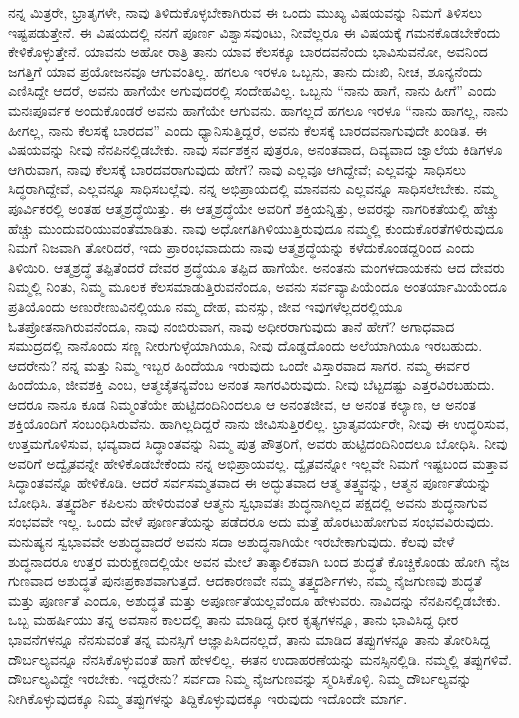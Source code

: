 ನನ್ನ ಮಿತ್ರರೇ, ಭ್ರಾತೃಗಳೇ, ನಾವು ತಿಳಿದುಕೊಳ್ಳಬೇಕಾಗಿರುವ ಈ ಒಂದು ಮುಖ್ಯ ವಿಷಯವನ್ನು ನಿಮಗೆ ತಿಳಿಸಲು ಇಷ್ಟಪಡುತ್ತೇನೆ. ಈ ವಿಷಯದಲ್ಲಿ ನನಗೆ ಪೂರ್ಣ ವಿಶ್ವಾಸವುಂಟು, ನೀವೆಲ್ಲರೂ ಈ ವಿಷಯಕ್ಕೆ ಗಮನಕೊಡಬೇಕೆಂದು ಕೇಳಿಕೊಳ್ಳುತ್ತೇನೆ. ಯಾವನು ಅಹೋ ರಾತ್ರಿ ತಾನು ಯಾವ ಕೆಲಸಕ್ಕೂ ಬಾರದವನೆಂದು ಭಾವಿಸುವನೋ, ಅವನಿಂದ ಜಗತ್ತಿಗೆ ಯಾವ ಪ್ರಯೋಜನವೂ ಆಗುವಂತಿಲ್ಲ. ಹಗಲೂ ಇರಳೂ ಒಬ್ಬನು, ತಾನು ದುಃಖಿ, ನೀಚ, ಶೂನ್ಯನೆಂದು ಎಣಿಸಿದ್ದೇ ಆದರೆ, ಅವನು ಹಾಗೆಯೇ ಅಗುವುದರಲ್ಲಿ ಸಂದೇಹವಿಲ್ಲ. ಒಬ್ಬನು “ನಾನು ಹಾಗೆ, ನಾನು ಹೀಗೆ” ಎಂದು ಮನಃಪೂರ್ವಕ ಅಂದುಕೊಂಡರೆ ಅವನು ಹಾಗೆಯೇ ಆಗುವನು. ಹಾಗಲ್ಲದೆ ಹಗಲೂ ಇರಳೂ “ನಾನು ಹಾಗಲ್ಲ, ನಾನು ಹೀಗಲ್ಲ, ನಾನು ಕೆಲಸಕ್ಕೆ ಬಾರದವ” ಎಂದು ಧ್ಯಾನಿಸುತ್ತಿದ್ದರೆ, ಅವನು ಕೆಲಸಕ್ಕೆ ಬಾರದವನಾಗುವುದೇ ಖಂಡಿತ. ಈ ವಿಷಯವನ್ನು ನೀವು ನೆನಪಿನಲ್ಲಿಡಬೇಕು. ನಾವು ಸರ್ವಶಕ್ತನ ಪುತ್ರರೂ, ಅನಂತವಾದ, ದಿವ್ಯವಾದ ಜ್ವಾಲೆಯ ಕಿಡಿಗಳೂ ಆಗಿರುವಾಗ, ನಾವು ಕೆಲಸಕ್ಕೆ ಬಾರದವರಾಗುವುದು ಹೇಗೆ? ನಾವು ಎಲ್ಲವೂ ಆಗಿದ್ದೇವೆ; ಎಲ್ಲವನ್ನು ಸಾಧಿಸಲು ಸಿದ್ಧರಾಗಿದ್ದೇವೆ, ಎಲ್ಲವನ್ನೂ ಸಾಧಿಸಬಲ್ಲೆವು. ನನ್ನ ಅಭಿಪ್ರಾಯದಲ್ಲಿ ಮಾನವನು ಎಲ್ಲವನ್ನೂ ಸಾಧಿಸಲೇಬೇಕು. ನಮ್ಮ ಪೂರ್ವಿಕರಲ್ಲಿ ಅಂತಹ ಆತ್ಮಶ್ರದ್ಧೆಯಿತ್ತು. ಈ ಆತ್ಮಶ್ರದ್ಧೆಯೇ ಅವರಿಗೆ ಶಕ್ತಿಯನ್ನಿತ್ತು, ಅವರನ್ನು ನಾಗರಿಕತೆಯಲ್ಲಿ ಹೆಚ್ಚು ಹೆಚ್ಚು ಮುಂದುವರಿಯುವಂತೆ\break ಮಾಡಿತು. ನಾವು ಅಧೋಗತಿಗಿಳಿಯುತ್ತಿರುವುದೂ ನಮ್ಮಲ್ಲಿ ಕುಂದುಕೊರತೆ\-ಗಳಿರುವುದೂ ನಿಮಗೆ ನಿಜವಾಗಿ ತೋರಿದರೆ, ಇದು ಪ್ರಾರಂಭವಾದುದು ನಾವು ಆತ್ಮಶ್ರದ್ಧೆಯನ್ನು ಕಳೆದುಕೊಂಡದ್ದರಿಂದ ಎಂದು ತಿಳಿಯಿರಿ. ಆತ್ಮಶ್ರದ್ಧೆ ತಪ್ಪಿತೆಂದರೆ ದೇವರ ಶ್ರದ್ಧೆಯೂ ತಪ್ಪಿದ ಹಾಗೆಯೇ. ಅನಂತನು ಮಂಗಳದಾಯಕನು ಆದ ದೇವರು ನಿಮ್ಮಲ್ಲಿ ನಿಂತು, ನಿಮ್ಮ ಮೂಲಕ ಕೆಲಸಮಾಡುತ್ತಿರುವನೆಂದೂ, ಅವನು ಸರ್ವವ್ಯಾಪಿಯೆಂದೂ ಅಂತರ್ಯಾಮಿಯೆಂದೂ ಪ್ರತಿಯೊಂದು ಅಣುರೇಣುವಿನಲ್ಲಿಯೂ ನಮ್ಮ ದೇಹ, ಮನಸ್ಸು, ಜೀವ ಇವುಗಳೆಲ್ಲದರಲ್ಲಿಯೂ ಓತಪ್ರೋತನಾಗಿರುವನೆಂದೂ, ನಾವು ನಂಬಿರುವಾಗ, ನಾವು ಅಧೀರರಾಗುವುದು ತಾನೆ ಹೇಗೆ? ಅಗಾಧವಾದ ಸಮುದ್ರದಲ್ಲಿ ನಾನೊಂದು ಸಣ್ಣ ನೀರುಗುಳ್ಳೆಯಾಗಿಯೂ, ನೀವು ದೊಡ್ಡದೊಂದು ಅಲೆಯಾಗಿಯೂ ಇರಬಹುದು. ಆದರೇನು? ನನ್ನ ಮತ್ತು ನಿಮ್ಮ ಇಬ್ಬರ ಹಿಂದೆಯೂ ಇರುವುದು ಒಂದೇ ವಿಸ್ತಾರವಾದ ಸಾಗರ. ನಮ್ಮ ಈರ್ವರ ಹಿಂದೆಯೂ, ಜೀವಶಕ್ತಿ ಎಂಬ, ಆತ್ಮಚೈತನ್ಯವೆಂಬ ಅನಂತ ಸಾಗರವಿರುವುದು. ನೀವು ಬೆಟ್ಟದಷ್ಟು ಎತ್ತರವಿರಬಹುದು. ಆದರೂ ನಾನೂ ಕೂಡ ನಿಮ್ಮಂತೆಯೇ ಹುಟ್ಟಿದಂದಿನಿಂದಲೂ ಆ ಅನಂತಜೀವ, ಆ ಅನಂತ ಕಲ್ಯಾಣ, ಆ ಅನಂತ ಶಕ್ತಿಯೊಂದಿಗೆ ಸಂಬಂಧಿಸಿರುವೆನು. ಹಾಗಿಲ್ಲದಿದ್ದರೆ ನಾನು ಜೀವಿಸುತ್ತಿರಲಿಲ್ಲ. ಭ್ರಾತೃವರ್ಯರೇ, ನೀವು ಈ ಉದ್ಧರಿಸುವ, ಉತ್ತಮಗೊಳಿಸುವ, ಭವ್ಯವಾದ ಸಿದ್ಧಾಂತವನ್ನು ನಿಮ್ಮ ಪುತ್ರ ಪೌತ್ರರಿಗೆ, ಅವರು ಹುಟ್ಟಿದಂದಿನಿಂದಲೂ ಬೋಧಿಸಿ. ನೀವು ಅವರಿಗೆ ಅದ್ವೈತವನ್ನೇ ಹೇಳಿಕೊಡಬೇಕೆಂದು ನನ್ನ ಅಭಿಪ್ರಾಯವಲ್ಲ. ದ್ವೈತವನ್ನೋ ಇಲ್ಲವೇ ನಿಮಗೆ ಇಷ್ಟಬಂದ ಮತ್ತಾವ ಸಿದ್ಧಾಂತವನ್ನೊ ಹೇಳಿಕೊಡಿ. ಆದರೆ ಸರ್ವಸಮ್ಮತವಾದ ಈ ಅದ್ಭುತವಾದ ಆತ್ಮ ತತ್ತ್ವವನ್ನು, ಆತ್ಮನ ಪೂರ್ಣತೆಯನ್ನು ಬೋಧಿಸಿ. ತತ್ತ್ವದರ್ಶಿ ಕಪಿಲನು ಹೇಳಿರುವಂತೆ ಆತ್ಮನು ಸ್ವಭಾವತಃ ಶುದ್ಧನಾಗಿಲ್ಲದ ಪಕ್ಷದಲ್ಲಿ ಅವನು ಶುದ್ಧನಾಗುವ ಸಂಭವವೇ ಇಲ್ಲ. ಒಂದು ವೇಳೆ ಪೂರ್ಣತೆಯನ್ನು ಪಡೆದರೂ ಅದು ಮತ್ತೆ ಹೊರಟುಹೋಗುವ ಸಂಭವವಿರುವುದು. ಮನುಷ್ಯನ ಸ್ವಭಾವವೇ ಅಶುದ್ಧವಾದರೆ ಅವನು ಸದಾ ಅಶುದ್ಧನಾಗಿಯೇ ಇರಬೇಕಾಗುವುದು. ಕೆಲವು ವೇಳೆ ಶುದ್ಧನಾದರೂ ಉತ್ತರ ಮರುಕ್ಷಣದಲ್ಲಿಯೇ ಅವನ ಮೇಲೆ ತಾತ್ಕಾಲಿಕವಾಗಿ ಬಂದ ಶುದ್ಧತೆ ಕೊಚ್ಚಿಕೊಂಡು ಹೋಗಿ ನೈಜ ಗುಣವಾದ ಅಶುದ್ಧತೆ ಪುನಃ\break ಪ್ರಕಾಶವಾಗುತ್ತದೆ. ಆದಕಾರಣವೇ ನಮ್ಮ ತತ್ತ್ವದರ್ಶಿಗಳು, ನಮ್ಮ ನೈಜ\-ಗುಣವು ಶುದ್ಧತೆ ಮತ್ತು ಪೂರ್ಣತೆ ಎಂದೂ, ಅಶುದ್ಧತೆ ಮತ್ತು ಅಪೂರ್ಣತೆಯಲ್ಲವೆಂದೂ ಹೇಳುವರು. ನಾವಿದನ್ನು ನೆನಪಿನಲ್ಲಿಡಬೇಕು. ಒಬ್ಬ ಮಹರ್ಷಿಯು ತನ್ನ ಅವಸಾನ ಕಾಲದಲ್ಲಿ ತಾನು ಮಾಡಿದ್ದ ಧೀರ ಕೃತ್ಯಗಳನ್ನೂ, ತಾನು ಭಾವಿಸಿದ್ದ ಧೀರ ಭಾವನೆಗಳನ್ನೂ ನೆನಸುವಂತೆ ತನ್ನ ಮನಸ್ಸಿಗೆ ಆಜ್ಞಾಪಿಸಿದನಲ್ಲದೆ, ತಾನು ಮಾಡಿದ ತಪ್ಪುಗಳನ್ನೂ ತಾನು ತೋರಿಸಿದ್ದ ದೌರ್ಬಲ್ಯವನ್ನೂ ನೆನಸಿಕೊಳ್ಳುವಂತೆ ಹಾಗೆ ಹೇಳಲಿಲ್ಲ. ಈತನ ಉದಾಹರಣೆಯನ್ನು ಮನಸ್ಸಿನಲ್ಲಿಡಿ. ನಮ್ಮಲ್ಲಿ ತಪ್ಪುಗಳಿವೆ. ದೌರ್ಬಲ್ಯವಿದ್ದೇ ಇರಬೇಕು. ಇದ್ದರೇನು? ಸರ್ವದಾ ನಿಮ್ಮ ನೈಜಗುಣವನ್ನು ಸ್ಮರಿಸಿಕೊಳ್ಳಿ. ನಿಮ್ಮ ದೌರ್ಬಲ್ಯವನ್ನು ನೀಗಿಕೊಳ್ಳುವುದಕ್ಕೂ ನಿಮ್ಮ ತಪ್ಪುಗಳನ್ನು ತಿದ್ದಿಕೊಳ್ಳುವುದಕ್ಕೂ ಇರುವುದು ಇದೊಂದೇ ಮಾರ್ಗ.

